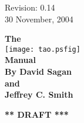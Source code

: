 \thispagestyle{empty}

\begin{flushright}
\large
  Revision: 0.14 \\
  30 November, 2004 \\
\end{flushright}

\vfill

{
\begin{center}
{\Huge \sf\bf The} \\
\vskip 0.1in
\texttt{[image: tao.psfig]} \\
\vskip 0.1in
{\Huge \sf\bf Manual} \\
\vskip 0.4in
{\Large \sf\bf By David Sagan \\ and \\ Jeffrey C. Smith} \\
\end{center}
}

\vskip 1in
\begin{center}
{\Huge \bf *** DRAFT ***}
\end{center}
\vfill
\break
